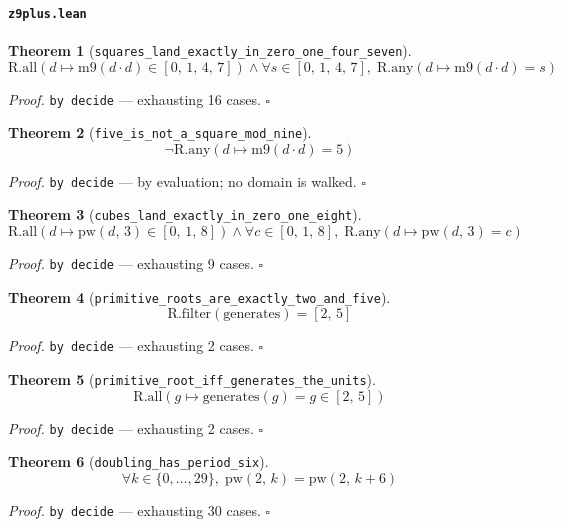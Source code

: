 \documentclass[11pt]{article}
\newtheorem{theorem}{Theorem}[section]
\begin{document}
\paragraph{\texttt{z9plus.lean}}

\begin{theorem}[\texttt{squares\_land\_exactly\_in\_zero\_one\_four\_seven}]
\[ \mathrm{R.all}\mathopen{}\left(d \mapsto \mathrm{m9}\mathopen{}\left(d \cdot d\right) \in [0,\,1,\,4,\,7]\right) \land \forall s \in [0,\,1,\,4,\,7],\; \mathrm{R.any}\mathopen{}\left(d \mapsto \mathrm{m9}\mathopen{}\left(d \cdot d\right) = s\right) \]
\end{theorem}
\noindent\emph{Proof.} \texttt{by decide} --- exhausting 16 cases. \hfill$\square$

\begin{theorem}[\texttt{five\_is\_not\_a\_square\_mod\_nine}]
\[ \lnot \mathrm{R.any}\mathopen{}\left(d \mapsto \mathrm{m9}\mathopen{}\left(d \cdot d\right) = 5\right) \]
\end{theorem}
\noindent\emph{Proof.} \texttt{by decide} --- by evaluation; no domain is walked. \hfill$\square$

\begin{theorem}[\texttt{cubes\_land\_exactly\_in\_zero\_one\_eight}]
\[ \mathrm{R.all}\mathopen{}\left(d \mapsto \mathrm{pw}\mathopen{}\left(d,\,3\right) \in [0,\,1,\,8]\right) \land \forall c \in [0,\,1,\,8],\; \mathrm{R.any}\mathopen{}\left(d \mapsto \mathrm{pw}\mathopen{}\left(d,\,3\right) = c\right) \]
\end{theorem}
\noindent\emph{Proof.} \texttt{by decide} --- exhausting 9 cases. \hfill$\square$

\begin{theorem}[\texttt{primitive\_roots\_are\_exactly\_two\_and\_five}]
\[ \mathrm{R.filter}\mathopen{}\left(\mathrm{generates}\right) = [2,\,5] \]
\end{theorem}
\noindent\emph{Proof.} \texttt{by decide} --- exhausting 2 cases. \hfill$\square$

\begin{theorem}[\texttt{primitive\_root\_iff\_generates\_the\_units}]
\[ \mathrm{R.all}\mathopen{}\left(g \mapsto \mathrm{generates}\mathopen{}\left(g\right) = g \in [2,\,5]\right) \]
\end{theorem}
\noindent\emph{Proof.} \texttt{by decide} --- exhausting 2 cases. \hfill$\square$

\begin{theorem}[\texttt{doubling\_has\_period\_six}]
\[ \forall k \in \{0,\dots,29\},\; \mathrm{pw}\mathopen{}\left(2,\,k\right) = \mathrm{pw}\mathopen{}\left(2,\,k + 6\right) \]
\end{theorem}
\noindent\emph{Proof.} \texttt{by decide} --- exhausting 30 cases. \hfill$\square$
\end{document}
